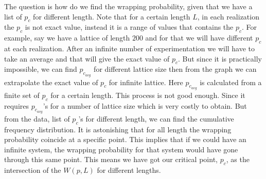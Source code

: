 	The question is how do we find the wrapping probability, given that we have a list of $p_c$ for different length. Note that for a certain length $L$, in each realization the $p_c$ is not exact value, instead it is a range of values that contains the $p_c$. For example, say we have a lattice of length $200$ and for that we will have different $p_c$ at each realization. After an infinite number of experimentation we will have to take an average and that will give the exact value of $p_c$. But since it is practically impossible, we can find $p_{c_{avg}}$ for different lattice size then from the graph we can extrapolate the exact value of $p_c$ for infinite lattice. Here $p_{c_{avg}}$ is calculated from a finite set of $p_c$ for a certain length. This process is not good enough. Since it requires  $p_{c_{avg}}$'s for a number of lattice size which is very costly to obtain. But from the data, list of $p_c$'s for different length, we can find the cumulative frequency distribution. It is astonishing  that for all length the wrapping probability coincide at a specific point. This implies that if we could have an infinite system, the wrapping probability for that system would have gone through this same point. This means we have got our critical point, $p_c$, as the intersection of the $W(p,L)$ for different lengths.
	

